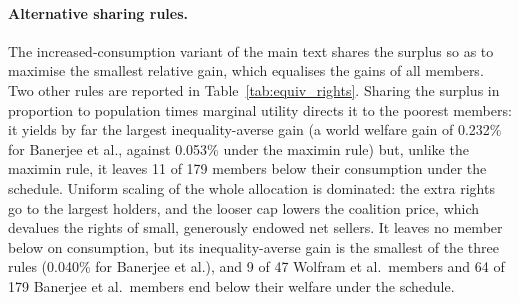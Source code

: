 \documentclass[12pt,english]{article}
\theoremstyle{remark}
\begin{document}


\paragraph{Alternative sharing rules.} The increased-consumption variant of the main text shares the surplus so as to maximise the smallest relative gain, which equalises the gains of all members. Two other rules are reported in Table~\ref{tab:equiv_rights}. Sharing the surplus in proportion to population times marginal utility directs it to the poorest members: it yields by far the largest inequality-averse gain (a world welfare gain of 0.232\% for Banerjee et al., against 0.053\% under the maximin rule) but, unlike the maximin rule, it leaves 11 of 179 members below their consumption under the schedule. Uniform scaling of the whole allocation is dominated: the extra rights go to the largest holders, and the looser cap lowers the coalition price, which devalues the rights of small, generously endowed net sellers. It leaves no member below on consumption, but its inequality-averse gain is the smallest of the three rules (0.040\% for Banerjee et al.), and 9 of 47 Wolfram et al.\ members and 64 of 179 Banerjee et al.\ members end below their welfare under the schedule.


\end{document}
